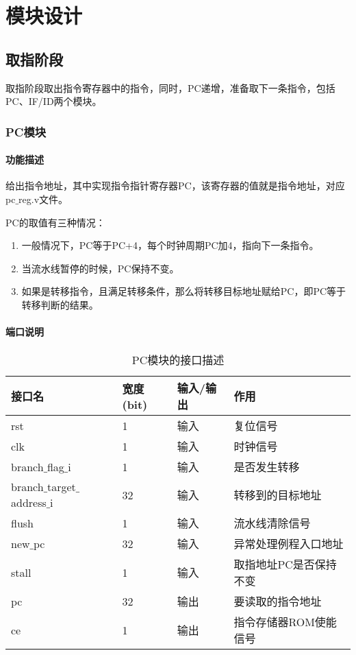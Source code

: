 \section{模块设计}
\subsection{取指阶段}
取指阶段取出指令寄存器中的指令，同时，PC递增，准备取下一条指令，包括PC、IF/ID两个模块。
\subsubsection{PC模块}
\paragraph{功能描述}
\quad

\quad

给出指令地址，其中实现指令指针寄存器PC，该寄存器的值就是指令地址，对应pc$\_$reg.v文件。

PC的取值有三种情况：
\begin{enumerate}[(1)]
	\item 一般情况下，PC等于PC+4，每个时钟周期PC加4，指向下一条指令。
	
	\item 当流水线暂停的时候，PC保持不变。
	
	\item 如果是转移指令，且满足转移条件，那么将转移目标地址赋给PC，即PC等于转移判断的结果。
\end{enumerate}
\paragraph{端口说明}
\quad

\quad
\begin{table}[H]
	\centering
	\caption{PC模块的接口描述}
	\begin{tabular}{|l|l|l|l|}
		\hline
		接口名 & 宽度(bit) & 输入/输出 & 作用 \\
		\hline
		rst & 1 & 输入 & 复位信号 \\
		\hline
		clk & 1 & 输入 & 时钟信号 \\
		\hline
		branch$\_$flag$\_$i & 1 & 输入 & 是否发生转移 \\
		\hline
		branch$\_$target$\_$address$\_$i & 32 & 输入 & 转移到的目标地址 \\
		\hline
		flush & 1 & 输入 & 流水线清除信号 \\
		\hline
		new$\_$pc & 32 & 输入 & 异常处理例程入口地址 \\
		\hline
		stall & 1 & 输入 & 取指地址PC是否保持不变 \\
		\hline
		pc & 32 & 输出 & 要读取的指令地址 \\
		\hline
		ce & 1 & 输出 & 指令存储器ROM使能信号 \\
		\hline
	\end{tabular}
\end{table}
